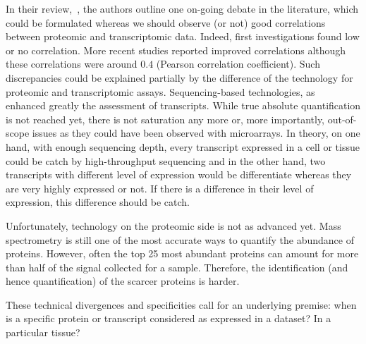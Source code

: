 In their review,~\citet{Uhlen:2016}, the authors outline one on-going debate
in the literature, which could be formulated whereas we should observe (or not)
good correlations between proteomic and transcriptomic data.
Indeed, first investigations found low or no correlation. More recent
studies reported improved correlations although these correlations were around
$0.4$ (Pearson correlation coefficient). Such discrepancies could be explained
partially by the difference of the technology for proteomic and transcriptomic
assays. Sequencing-based technologies, as \Rnaseq\, enhanced greatly the
assessment of transcripts. While true absolute quantification is not reached yet,
there is not saturation any more or, more importantly, out-of-scope issues as
they could have been observed with microarrays. In theory, on one hand, with
enough sequencing depth, every transcript expressed in a cell or tissue could be
catch by high-throughput sequencing and in the other hand, two transcripts with
different level of expression would be differentiate whereas they are very highly
expressed or not. If there is a difference in their level of expression, this
difference should be catch.

Unfortunately, technology on the proteomic side is not as advanced yet.
Mass spectrometry is still one of the most accurate ways to quantify the
abundance of proteins. However, often the top 25 most abundant proteins can
amount for more than half of the signal collected for a sample. Therefore, the
identification (and hence quantification) of the scarcer proteins is harder.

These technical divergences and specificities call for an underlying premise:
when is a specific protein or transcript considered as expressed in a dataset?
In a particular tissue?

